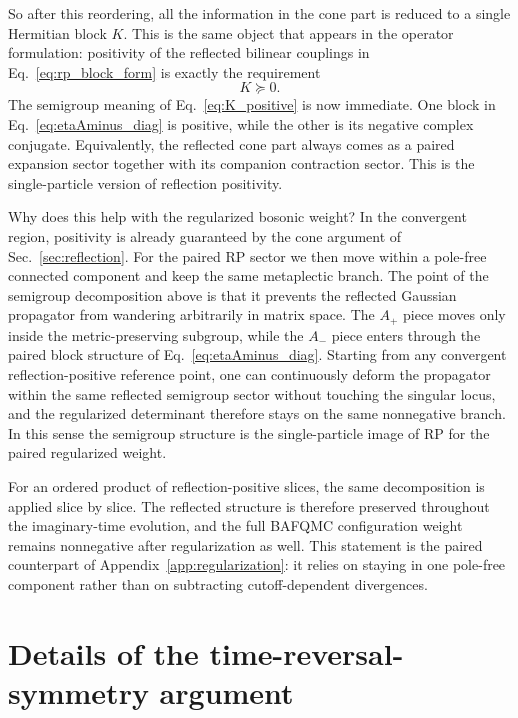 \documentclass[twocolumn,aps,prb,10pt,amsmath,amssymb,amsthm,superscriptaddress]{revtex4-2}
\theoremstyle{remark}
\begin{document}
So after this reordering, all the information in the cone part is reduced to a single Hermitian block $K$. This is the same object that appears in the operator formulation: positivity of the reflected bilinear couplings in Eq.~\eqref{eq:rp_block_form} is exactly the requirement
\begin{equation}
    K \succeq 0.
    \label{eq:K_positive}
\end{equation}
The semigroup meaning of Eq.~\eqref{eq:K_positive} is now immediate. One block in Eq.~\eqref{eq:etaAminus_diag} is positive, while the other is its negative complex conjugate. Equivalently, the reflected cone part always comes as a paired expansion sector together with its companion contraction sector. This is the single-particle version of reflection positivity.

Why does this help with the regularized bosonic weight? In the convergent region, positivity is already guaranteed by the cone argument of Sec.~\ref{sec:reflection}. For the paired RP sector we then move within a pole-free connected component and keep the same metaplectic branch. The point of the semigroup decomposition above is that it prevents the reflected Gaussian propagator from wandering arbitrarily in matrix space. The $A_{+}$ piece moves only inside the metric-preserving subgroup, while the $A_{-}$ piece enters through the paired block structure of Eq.~\eqref{eq:etaAminus_diag}. Starting from any convergent reflection-positive reference point, one can continuously deform the propagator within the same reflected semigroup sector without touching the singular locus, and the regularized determinant therefore stays on the same nonnegative branch. In this sense the semigroup structure is the single-particle image of RP for the paired regularized weight.

For an ordered product of reflection-positive slices, the same decomposition is applied slice by slice. The reflected structure is therefore preserved throughout the imaginary-time evolution, and the full BAFQMC configuration weight remains nonnegative after regularization as well. This statement is the paired counterpart of Appendix~\ref{app:regularization}: it relies on staying in one pole-free component rather than on subtracting cutoff-dependent divergences.

\section{Details of the time-reversal-symmetry argument}
\label{app:kramers}
\end{document}
